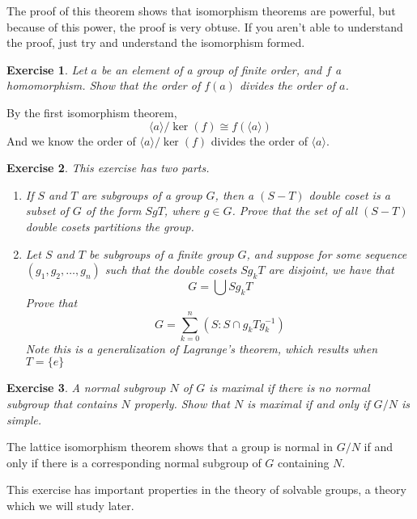 \documentclass[12pt]{amsbook}
\makeatletter
\theoremstyle{plain}
\newtheorem{exercise}{Exercise}
\theoremstyle{definition}
\renewenvironment{proof}[1][\proofname]{\par
  \pushQED{\qed}%
  \normalfont \topsep6\p@\@plus6\p@\relax
  \list{}{\leftmargin=0em
          \rightmargin=\leftmargin
          \settowidth{\itemindent}{\itshape#1}%
          \labelwidth=\itemindent}

  \item[\hskip\labelsep
        \itshape
    #1\@addpunct{.}]\ignorespaces
}{%
  \popQED\endlist\@endpefalse
}
\makeatother
\begin{document}
The proof of this theorem shows that isomorphism theorems are powerful, but because of this power, the proof is very obtuse. If you aren't able to understand the proof, just try and understand the isomorphism formed.

\begin{exercise}
    Let $a$ be an element of a group of finite order, and $f$ a homomorphism. Show that the order of $f(a)$ divides the order of $a$.
\end{exercise}
\begin{proof}
    By the first isomorphism theorem,
    \[ \langle a \rangle / \ker(f) \cong f(\langle a \rangle) \]
    And we know the order of $\langle a \rangle / \ker(f)$ divides the order of $\langle a \rangle$.
\end{proof}

\begin{exercise}
    This exercise has two parts.

    \begin{enumerate}
        \item If $S$ and $T$ are subgroups of a group $G$, then a $(S - T)$ double coset is a subset of $G$ of the form $SgT$, where $g \in G$. Prove that the set of all $(S - T)$ double cosets partitions the group.
        \item Let $S$ and $T$ be subgroups of a finite group $G$, and suppose for some sequence $(g_1, g_2, \dots, g_n)$ such that the double cosets $Sg_kT$ are disjoint, we have that
        \[ G = \bigcup Sg_kT \]
        Prove that
        \[ G = \sum_{k = 0}^n (S:S \cap g_kTg_k^{-1}) \]
        Note this is a generalization of Lagrange's theorem, which results when $T = \{ e \}$
    \end{enumerate}
\end{exercise}

\begin{exercise}
    A normal subgroup $N$ of $G$ is maximal if there is no normal subgroup that contains $N$ properly. Show that $N$ is maximal if and only if $G/N$ is simple.
\end{exercise}
\begin{proof}
    The lattice isomorphism theorem shows that a group is normal in $G/N$ if and only if there is a corresponding normal subgroup of $G$ containing $N$.
\end{proof}

This exercise has important properties in the theory of solvable groups, a theory which we will study later.
\end{document}
